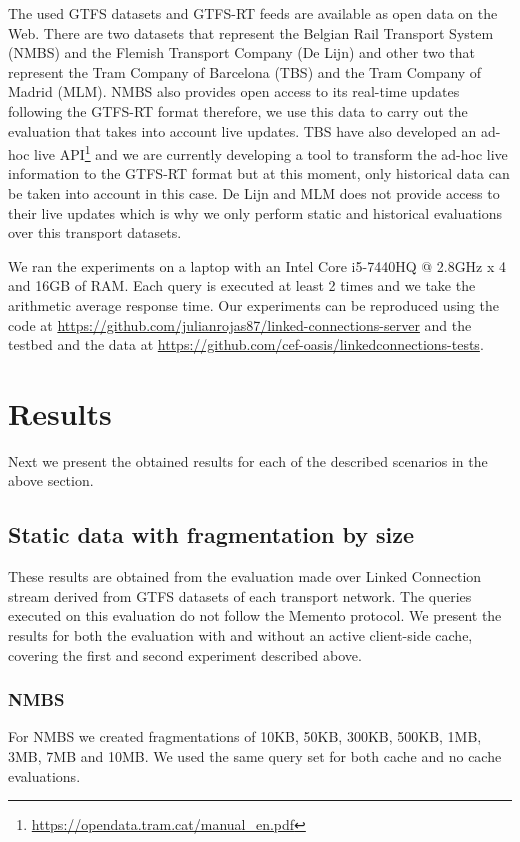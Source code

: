 \documentclass[sw]{iosart2x}
\begin{document}
	The used GTFS datasets and GTFS-RT feeds are available as open data on the Web. There are two datasets that represent the Belgian Rail Transport System (NMBS) and the Flemish Transport Company (De Lijn) and other two that represent the Tram Company of Barcelona (TBS) and the Tram Company of Madrid (MLM). NMBS also provides open access to its real-time updates following the GTFS-RT format therefore, we use this data to carry out the evaluation that takes into account live updates. TBS have also developed an ad-hoc live API\footnote{\url{https://opendata.tram.cat/manual_en.pdf}} and we are currently developing a tool to transform the ad-hoc live information to the GTFS-RT format but at this moment, only historical data can be taken into account in this case. De Lijn and MLM does not provide access to their live updates which is why we only perform static and historical evaluations over this transport datasets.
	
	We ran the experiments on a laptop with an Intel Core i5-7440HQ @ 2.8GHz x 4 and 16GB of RAM. Each query is executed at least 2 times and we take the arithmetic average response time. Our experiments can be reproduced using the code at \url{https://github.com/julianrojas87/linked-connections-server} and the testbed and the data at \url{https://github.com/cef-oasis/linkedconnections-tests}.
	
	\section{Results}
	Next we present the obtained results for each of the described scenarios in the above section.
	
	\subsection{Static data with fragmentation by size}
	These results are obtained from the evaluation made over Linked Connection stream derived from GTFS datasets of each transport network. The queries executed on this evaluation do not follow the Memento protocol. We present the results for both the evaluation with and without an active client-side cache, covering the first and second experiment described above.
	
	\subsubsection{NMBS}
	For NMBS we created fragmentations of 10KB, 50KB, 300KB, 500KB, 1MB, 3MB, 7MB and 10MB. We used the same query set for both cache and no cache evaluations.
	
\end{document}
